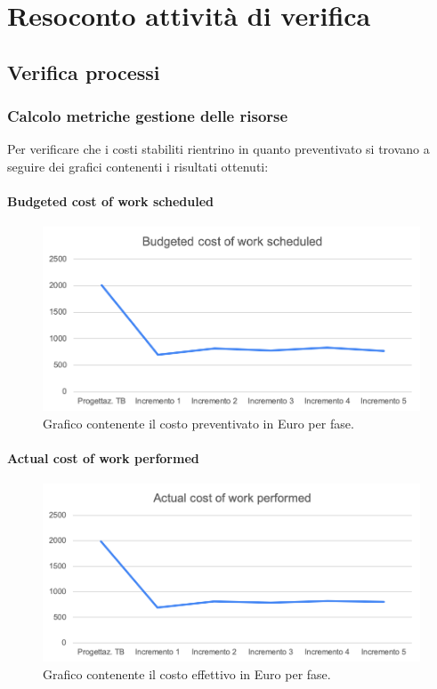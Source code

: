 \appendix
{}

\section{Resoconto attività di verifica}

\subsection{Verifica processi}

\subsubsection{Calcolo metriche gestione delle risorse}
Per verificare che i costi stabiliti rientrino in quanto preventivato si trovano a seguire dei grafici contenenti i risultati ottenuti:

	\paragraph{Budgeted cost of work scheduled}
		\begin{figure}[H]
			\centering
			\includegraphics[width=0.8\linewidth]{./res/images/BCWS_1.png}
			\caption{Grafico contenente il costo preventivato in Euro per fase.}
			\label{fig:Grafico contenente il costo preventivato in Euro per fase.}
		\end{figure}

	\paragraph{Actual cost of work performed}
		\begin{figure}[H]
			\centering
			\includegraphics[width=0.8\linewidth]{./res/images/ACWP_1.png}
			\caption{Grafico contenente il costo effettivo in Euro per fase.}
			\label{fig:Grafico contenente il costo effettivo in Euro per fase.}
		\end{figure}

